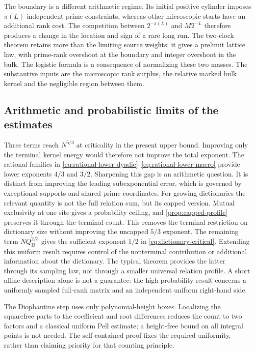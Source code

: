 The boundary is a different arithmetic regime. Its initial positive
cylinder imposes $\pi(L)$ independent prime constraints, whereas other
microscopic starts have an additional rank cost. The competition between
$2^{-\pi(L)}$ and $M2^{-L}$ therefore produces a change in the location
and sign of a rare long run. The two-clock theorem retains more than the
limiting source weights: it gives a prelimit lattice law, with prime-rank
overshoot at the boundary and integer overshoot in the bulk. The logistic
formula is a consequence of normalizing these two masses. The substantive
inputs are the microscopic rank surplus, the relative marked bulk kernel
and the negligible region between them.

\subsection{Arithmetic and probabilistic limits of the estimates}
Three terms reach $N^{5/3}$ at criticality in the present upper bound.
Improving only the terminal kernel energy would therefore not improve the
total exponent. The rational families in
\eqref{eq:rational-lower-dyadic}--\eqref{eq:rational-lower-macro} provide
lower exponents $4/3$ and $3/2$. Sharpening this gap is an arithmetic
question. It is distinct from improving the leading subexponential error,
which is governed by exceptional supports and shared prime coordinates.
For growing dictionaries the relevant quantity is not the full relation
sum, but its capped version. Mutual exclusivity at one site gives a
probability ceiling, and \cref{prop:capped-profile} preserves it through
the terminal count. This removes the terminal restriction on dictionary
size without improving the uncapped $5/3$ exponent. The remaining term
$NQ_B^{2/3}$ gives the sufficient exponent $1/2$ in
\eqref{eq:dictionary-critical}. Extending this uniform result requires control of the nonterminal
contribution or additional information about the dictionary. The typical
theorem provides the latter through its sampling law, not through a
smaller universal relation profile. A short affine description alone is
not a guarantee: the high-probability result concerns a uniformly sampled
full-rank matrix and an independent uniform right-hand side.

The Diophantine step uses only polynomial-height boxes. Localizing the
squarefree parts to the coefficient and root differences reduces the
count to two factors and a classical uniform Pell estimate; a height-free
bound on all integral points is not needed. The self-contained proof
fixes the required uniformity, rather than claiming priority for that
counting principle.

